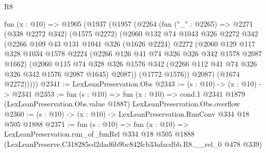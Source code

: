 \begin{lexlean}{R8}
\begin{coremodule}
  fun (x : @10) =>
  @1905
    (@1937
      (@1957
        (@2264
          (fun ("_" : @2265) =>
          @2271
            (@338 @2272 @342)
            (@1575 @2272)
            (@2060
              @132
              @74
              @1043
              @326
              @2272
              @342
              (@2266
                @109
                @43
                @131
                @1041
                @326
                (@1626 @2224)
                @2272
                (@2060
                  @129
                  @117
                  @328
                  @1034
                  @1578
                  @2224
                  (@2266 @126 @41 @74 @326 @326 @342 @1578 @2087 @1662)
                  (@2060
                    @115
                    @74
                    @328
                    @326
                    @1576
                    @342
                    (@2266 @112 @41 @74 @326 @326 @342 @1576 @2087 @1645)
                    @2087))
                (@1772 @1576))
              @2087)
            (@1674 @2272)))))
@2341 := LexLeanPreservation.Obs
@2343 := (s : @10) -> (x : @10) -> @2341
@2353 := fun (s : @10) =>
  fun (x : @10) =>
  cond.{1} @2341 @1879 (LexLeanPreservation.Obs.value @1887) LexLeanPreservation.Obs.overflow
@2360 := (s : @10) -> (x : @10) -> LexLeanPreservation.RunConv @334 @18 @505 @1888
@2371 := fun (s : @10) =>
  fun (x : @10) =>
  LexLeanPreservation.run_of_funRel
    @334
    @18
    @505
    @1888
    (LexLeanPreserve.C318285cd2dad6b9bc842fcb33afacdbb.R8.__rel_0 @478 @339)
\end{coremodule}
\end{lexlean}
